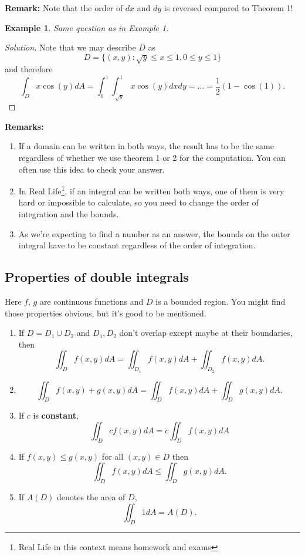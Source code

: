 \documentclass[12pt]{article}
\newenvironment{solution}
  {\begin{proof}[Solution]}
  {\end{proof}}
\newtheorem{example}{Example}
\begin{document}
\textbf{Remark: }Note that the order of $dx$ and $dy$ is reversed compared to Theorem 1!

\begin{example} Same question as in Example 1.  
\end{example}
\begin{solution} Note that we may describe $D$ as $$D=\{ (x,y): \sqrt{y}\leq x\leq 1, 0\leq y\leq 1 \}$$ and therefore $$\int_D x\cos(y) dA =\int_0^1\int_{\sqrt{y}}^1 x\cos(y) dx dy=\dots=\frac{1}{2}(1-\cos(1)).$$

\end{solution}






\textbf{Remarks:} \begin{enumerate}
\item If a domain can be written in both ways, the result has to be the same regardless of whether we use theorem 1 or 2 for the computation. You can often use this idea to check your answer.
\item In Real Life\footnote{Real Life in this context means homework and exams}, if an integral can be written both ways, one of them is very hard or impossible to calculate, so you need to change the order of integration and the bounds.
\item As we're expecting to find a number as an answer, the bounds on the outer integral have to be constant regardless of the order of integration.

\end{enumerate}

\subsection*{Properties of double integrals}
Here $f$, $g$ are continuous functions and $D$ is a bounded region. You might find those properties obvious, but it's good to be mentioned.
\begin{enumerate} 
\item If $D=D_1 \cup D_2$ and $D_1,D_2$ don't overlap except maybe at their boundaries, then $$\iint_D f(x,y) dA=\iint_{D_1}f(x,y)dA + \iint_{D_2}f(x,y) dA.$$
\item $$\iint_Df(x,y)+g(x,y)dA=\iint_D f(x,y)dA +\iint_D g(x,y)dA.$$
\item If $c$ is \textbf{constant}, $$\iint_D cf(x,y) dA=c\iint_D f(x,y) dA$$
\item If $f(x,y)\leq g(x,y)$ for all $(x,y)\in D$ then $$\iint_D f(x,y)dA\leq \iint_D g(x,y) dA.$$
\item If $A(D)$ denotes the area of $D$, $$\iint_D1dA=A(D).$$ 
\end{enumerate}
\end{document}

